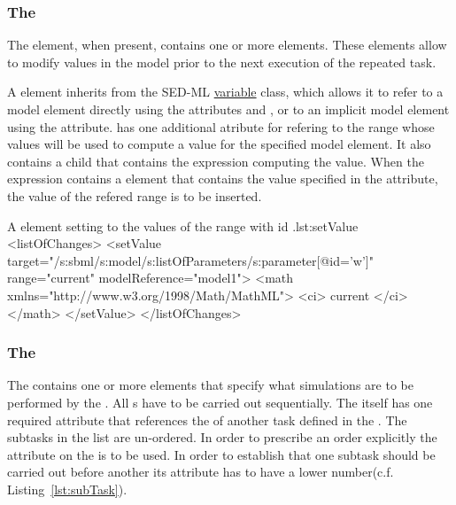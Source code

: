\subsubsection{The }
\label{class:changes}
\label{class:setValue}

The  element, when present, contains one or more  elements.
These elements allow to modify values in the model prior to the next execution of the repeated task.

A  element inherits from the SED-ML \hyperref[class:variable]{variable} class, which allows it to refer to a model element directly using the attributes  and , or to an implicit model element using the  attribute.
 has one additional atribute  for refering to the range whose values will be used to compute a value for the specified model element.
It also contains a child  that contains the expression computing the value.
When the expression contains a  element that contains the value specified in the  attribute, the value of the refered range is to be inserted.

\begin{myXmlLst}{A  element setting  to the values of the range with id .}{lst:setValue}
  <listOfChanges>
    <setValue target="/s:sbml/s:model/s:listOfParameters/s:parameter[@id='w']"
              range="current" modelReference="model1">
      <math xmlns="http://www.w3.org/1998/Math/MathML">
        <ci> current </ci>
      </math>
    </setValue>
  </listOfChanges>
\end{myXmlLst}

\subsubsection{The }
\label{class:subTasks}
The  contains one or more  elements that specify what simulations are to be performed by the . All s have to be carried out sequentially. The  itself has one required attribute  that references the  of another task defined in the . The subtasks in the list are un-ordered.  In order to prescribe an order explicitly the  attribute on the  is to be used. In order to establish that one subtask should be carried out before another its  attribute has to have a lower number(c.f. Listing~\ref{lst:subTask}).

